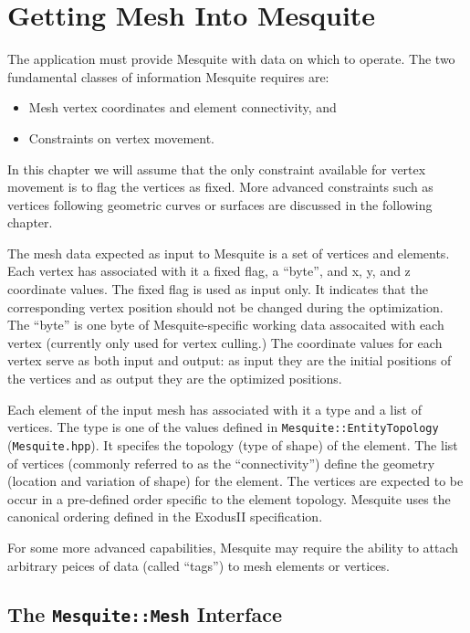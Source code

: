 \chapter{Getting Mesh Into Mesquite}
\label{sec:meshes}

The application must provide Mesquite with data on which to operate.  The two
fundamental classes of information Mesquite requires are:
\begin{itemize}
\item Mesh vertex coordinates and element connectivity, and
\item Constraints on vertex movement.
\end{itemize}
In this chapter we will assume that the only constraint available for vertex movement is to flag the vertices as fixed.  More advanced constraints such as vertices following geometric curves or surfaces are discussed in the following chapter.  

The mesh data expected as input to Mesquite is a set of vertices and elements.  Each vertex has associated with it a fixed flag, a ``byte'', and x, y, and z coordinate values.  The fixed flag is used as input only.  It indicates that the corresponding vertex position should not be changed during the optimization.  The ``byte'' is one byte of Mesquite-specific working data assocaited with each vertex (currently only used for vertex culling.)   The coordinate values for each vertex serve as both input and output: as input they are the initial positions of the vertices and as output they are the optimized positions.  

Each element of the input mesh has associated with it a type and a list of vertices.  The type is one of the values defined in \texttt{Mesquite::EntityTopology} (\texttt{Mesquite.hpp}).  It specifes the topology (type of shape) of the element.  The list of vertices (commonly referred to as the ``connectivity'') define the geometry (location and variation of shape) for the element.  The vertices are expected to be occur in a pre-defined order specific to the element topology. Mesquite uses the canonical ordering defined in the ExodusII specification\cite{exodus}.

For some more advanced capabilities, Mesquite may require the ability to attach arbitrary peices of data (called ``tags'') to mesh elements or vertices.

\section{The \texttt{Mesquite::Mesh} Interface} \label{sec:MeshData}

